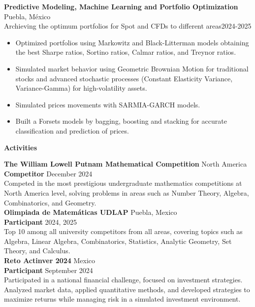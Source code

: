 \documentclass[9pt]{extarticle} %
\begin{document}
\textbf{Predictive Modeling, Machine Learning and Portfolio Optimization}  \hfill Puebla, México\\
Archieving the optimum portfolios for Spot and CFDs to different areas\hfill 2024-2025
\begin{itemize}[noitemsep, topsep=0pt, partopsep=0pt, parsep=0pt]
    \item Optimized portfolios using Markowitz and Black-Litterman models obtaining the best Sharpe ratios, Sortino ratios, Calmar ratios, and Treynor ratios.
    \item Simulated market behavior using Geometric Brownian Motion for traditional stocks and advanced stochastic processes (Constant Elasticity Variance, Variance-Gamma) for high-volatility assets. 
    \item Simulated prices movements with SARMIA-GARCH models.
    \item Built a Forsets models by bagging, boosting and stacking for accurate classification and prediction of prices.
\end{itemize}  











\begin{center}
    \vspace{1ex}
    \textbf{Activities}
    \vspace{-1ex}
\end{center}

\textbf{The William Lowell Putnam Mathematical Competition} \hfill North America\\
\textbf{Competitor} \hfill December 2024\\
Competed in the most prestigious undergraduate mathematics competitions at North America level, solving  problems in areas such as Number Theory, Algebra, Combinatorics, and Geometry.\\

\textbf{Olimpiada de Matemáticas UDLAP} \hfill Puebla, Mexico\\
\textbf{Participant} \hfill 2024, 2025\\
Top 10 among all university competitors from all areas, covering topics such as Algebra, Linear Algebra, Combinatorics, Statistics, Analytic Geometry, Set Theory, and Calculus.\\

\textbf{Reto Actinver 2024} \hfill Mexico\\
\textbf{Participant} \hfill September 2024\\
Participated in a national financial challenge, focused on investment strategies. Analyzed market data, applied quantitative methods, and developed strategies to maximize returns while managing risk in a simulated investment environment.\\
\end{document}
